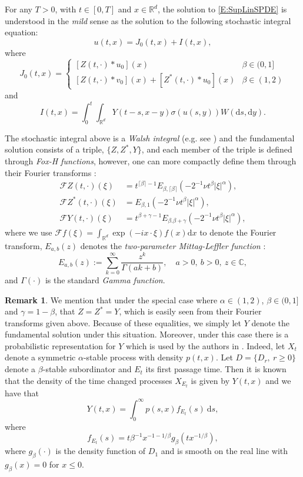 \documentclass[12pt]{report}
\theoremstyle{plain}
\theoremstyle{definition}
\newtheorem{remark}[theorem]{Remark}
\numberwithin{equation}{section}
\newcommand{\R}{\mathbb{R}}
\newcommand{\ud}{\ensuremath{ \mathrm{d} }}
\begin{document}
For any $T>0$, with $t \in [0,T]$ and $x \in \R^d$, the solution to \eqref{E:SupLinSPDE} is understood in the {\em mild} sense as the solution to the following stochastic integral equation:
\[
u(t,x) = J_0(t,x) + I(t,x),
\]
where
\[
J_0(t,x) =\begin{cases} 
[Z(t,\cdot)*u_0](x) & \beta \in (0,1]
\\	[Z(t,\cdot)*v_0](x) + [Z^*(t,\cdot)*u_0](x) & \beta \in (1,2)
\end{cases}
\]
and
\[
I(t,x) = \int_0^t \int_{\R^d} Y(t-s,x-y)\sigma(u(s,y)) W(\ud s, \ud y).
\]

The stochastic integral above is a {\em Walsh integral} (e.g. see \cite{walsh:86:introduction}) and the fundamental solution consists of a triple, $\{Z, Z^*, Y\}$, and each member of the triple is defined through {\em Fox-H functions}, however, one can more compactly define them through their Fourier transforms \cite[Theorem 4.1]{chen.hu.ea:19:nonlinear}: 
\begin{align*}
\mathcal{F}Z(t,\cdot)(\xi) &= t^{\lceil \beta \rceil -1} E_{\beta, \lceil \beta \rceil}\left(-2^{-1} \nu t^\beta |\xi|^{\alpha}\right), \\
\mathcal{F}Z^*(t,\cdot)(\xi) &= E_{\beta, 1}\left(-2^{-1} \nu t^\beta |\xi|^{\alpha}\right), \\
\mathcal{F}Y(t,\cdot)(\xi) &= t^{\beta + \gamma-1}E_{\beta. \beta +\gamma}\left(-2^{-1}\nu t^\beta |\xi|^\alpha\right),
\end{align*}
where we use $\mathcal{F}f(\xi) = \int_{\R^d} \exp(-i x \cdot \xi) f(x) \ud x$ to denote the Fourier transform, $E_{a, b}(z)$ denotes the {\em two-parameter Mittag-Leffler function} \cite{podlubny:99:fractional}:
\[
E_{a,b}(z) := \sum_{k=0}^{\infty} \frac{z^k}{\Gamma(ak+b)}, \quad a>0, \: b>0, \: z \in \mathbb{C},
\]
and $\Gamma(\cdot)$ is the standard {\em Gamma function}. 

\begin{remark}
	We mention that under the special case where $\alpha \in (1,2)$, $\beta \in (0,1]$ and $\gamma = 1 - \beta$, that $Z = Z^* = Y$, which is easily seen from their Fourier transforms given above. Because of these equalities, we simply let $Y$ denote the fundamental solution under this situation. Moreover, under this case there is a probabilistic representation for $Y$ which is used by the authors in \cite{foondun.liu.ea:19:some, foondun.nane:17:asymptotic, mijena.nane:15:space-time, foondun.liu.ea:17:moment, mijena.nane:16:intermittence}.  Indeed, let $X_t$ denote a symmetric $\alpha$-stable process with density $p(t,x)$. Let $D=\{D_r, \: r \ge 0\}$ denote a $\beta$-stable subordinator and $E_t$ its first passage time. Then it is known that the density of the time changed processes $X_{E_t}$ is given by $Y(t,x)$ and we have that 
	\[
	Y(t,x) = \int_0^\infty p(s,x)f_{E_t}(s) \: \ud s,
	\]
	where
	\[
	f_{E_t}(s) = t \beta^{-1} x^{-1-1/\beta}g_{\beta}\left(tx^{-1/\beta} \right),
	\]
	where $g_\beta(\cdot)$ is the density function of $D_1$ and is smooth on the real line with $g_{\beta}(x) = 0$ for $x \le 0$.
\end{remark}
\end{document}
